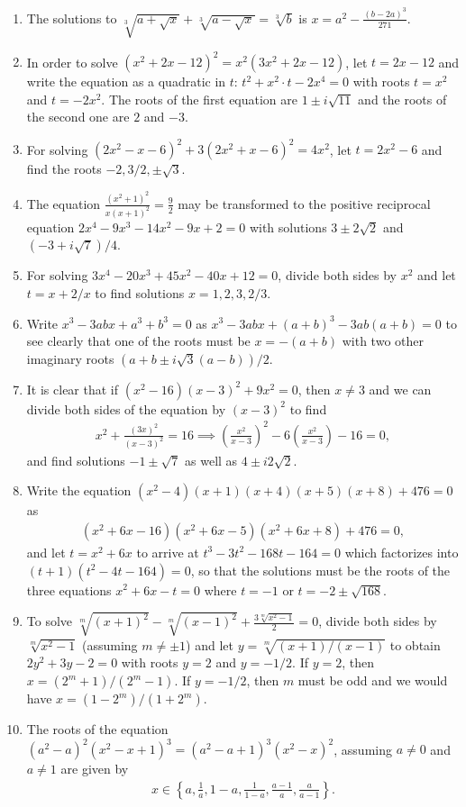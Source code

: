 \documentclass[12pt,a4paper]{memoir}
\theoremstyle{definition}
\begin{document}
\begin{solution}
\begin{enumerate}
		\item The solutions to $\sqrt[3]{a+\sqrt x} + \sqrt[3]{a-\sqrt x} =\sqrt[3]{b}$ is $x=a^2-\displaystyle\frac{(b-2a)^3}{271}$.
		\item In order to solve $(x^2+2x-12)^2=x^2(3x^2+2x-12)$, let $t=2x-12$ and write the equation as a quadratic in $t$: $t^2 + x^2 \cdot t - 2x^4 =0$ with roots $t=x^2$ and $t=-2x^2$. The roots of the first equation are $1\pm i\sqrt{11}$ and the roots of the second one are $2$ and $-3$.
		\item For solving $(2x^2-x-6)^2+3(2x^2+x-6)^2=4x^2$, let $t=2x^2-6$ and find the roots $-2, 3/2, \pm \sqrt 3$.
		\item The equation $\displaystyle \frac{(x^2+1)^2}{x(x+1)^2} = \frac{9}{2}$ may be transformed to the positive reciprocal equation $2x^4-9x^3-14x^2-9x+2=0$ with solutions $3\pm 2\sqrt 2$ and $(-3+i\sqrt 7)/4$.
		\item For solving $3x^4-20x^3+45x^2-40x+12=0$, divide both sides by $x^2$ and let $t=x+2/x$ to find solutions $x=1,2,3,2/3$.
		\item Write $x^3-3abx+a^3+b^3=0$ as $x^3-3abx+(a+b)^3-3ab(a+b)=0$ to see clearly that one of the roots must be $x=-(a+b)$ with two other imaginary roots $(a+b\pm i\sqrt 3 (a-b))/2$.
		\item It is clear that if $(x^2-16)(x-3)^2+9x^2=0$, then $x\neq 3$ and we can divide both sides of the equation by $(x-3)^2$ to find
		\begin{align*}
			x^2+\frac{(3x)^2}{(x-3)^2}=16 \implies \left(\frac{x^2}{x-3}\right)^2 - 6\left(\frac{x^2}{x-3}\right) - 16= 0,
		\end{align*}
		and find solutions $-1\pm \sqrt 7$ as well as $4\pm i2\sqrt 2$.
		\item Write the equation $(x^2-4)(x+1)(x+4)(x+5)(x+8)+476=0$ as 
		\begin{align*}
			(x^2+6x-16)(x^2+6x-5)(x^2+6x+8)+476=0,
		\end{align*}
		and let $t=x^2+6x$ to arrive at $t^3-3t^2-168t-164=0$ which factorizes into $(t+1)(t^2-4t-164)=0$, so that the solutions must be the roots of the three equations $x^2+6x-t=0$ where $t=-1$ or $t=-2\pm\sqrt{168}$.
		\item To solve $\sqrt[m]{(x+1)^2} - \sqrt[m]{(x-1)^2} + \displaystyle \frac{3\sqrt[m]{x^2-1}}{2}=0$, divide both sides by $\sqrt[m]{x^2-1}$ (assuming $m\neq \pm 1$) and let $y= \sqrt[m]{(x+1)/(x-1)}$ to obtain $2y^2+3y-2=0$ with roots $y=2$ and $y=-1/2$. If $y=2$, then $x=(2^m+1)/(2^m-1)$. If $y=-1/2$, then $m$ must be odd and we would have $x=(1-2^m)/(1+2^m)$. 
		\item The roots of the equation $(a^2-a)^2(x^2-x+1)^3 = (a^2-a+1)^3(x^2-x)^2$, assuming $a\neq 0$ and $a\neq 1$ are given by
		\begin{align*}
			x \in \left\{a, \frac{1}{a}, 1-a, \frac{1}{1-a}, \frac{a-1}{a}, \frac{a}{a-1}\right\}.
		\end{align*}
	\end{enumerate}
\end{solution}
\end{document}
